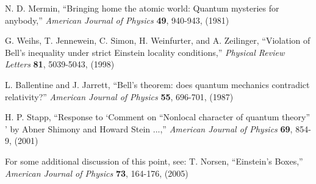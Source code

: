 \documentclass[aps,prc,onecolumn,12pt]{revtex4-2}
\begin{document}
\begin{thebibliography}{00}
  N. D. Mermin, ``Bringing home the atomic
  world: Quantum mysteries for anybody,'' \emph{American Journal of
  Physics} {\bf{49}}, 940-943, (1981)

 G. Weihs, T. Jennewein, C. Simon, H. Weinfurter, and
  A. Zeilinger, ``Violation of Bell's inequality under strict Einstein
  locality conditions,'' \emph{Physical Review Letters} {\bf{81}},
  5039-5043, (1998)

 L. Ballentine and J. Jarrett, ``Bell's
  theorem: does quantum mechanics contradict relativity?''
  \emph{American Journal of Physics} {\bf{55}}, 696-701, (1987)

  H. P. Stapp, ``Response to `Comment on
  ``Nonlocal character of quantum theory'' ' by Abner Shimony and
  Howard Stein ...,'' \emph{American Journal of Physics} {\bf{69}},
  854-9, (2001)

 For some additional discussion of this point, see:
 T. Norsen, ``Einstein's Boxes,''
  \emph{American Journal of Physics} {\bf{73}}, 164-176, (2005)



\end{thebibliography}
\end{document}
